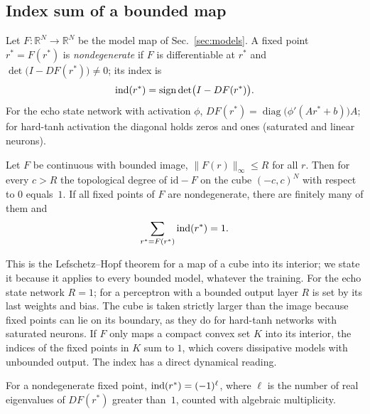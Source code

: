 \subsection{Index sum of a bounded map}
\label{sec:degree}

Let $F:\mathbb{R}^N\to\mathbb{R}^N$ be the model map of Sec.~\ref{sec:models}. A fixed point $r^*=F(r^*)$ is
\emph{nondegenerate} if $F$ is differentiable at $r^*$ and $\det\bigl(I-DF(r^*)\bigr)\neq0$; its index is
\begin{equation}
\operatorname{ind}(r^*)=\operatorname{sign}\det\bigl(I-DF(r^*)\bigr).
\label{eq:index}
\end{equation}
For the echo state network with activation $\phi$, $DF(r^*)=\operatorname{diag}\bigl(\phi'(Ar^*+b)\bigr)A$; for hard-tanh activation the diagonal
holds zeros and ones (saturated and linear neurons).

\begin{theorem}
\label{thm:degree}
Let $F$ be continuous with bounded image, $\|F(r)\|_\infty\le R$ for all $r$. Then for every $c>R$ the topological
degree of $\mathrm{id}-F$ on the cube $(-c,c)^N$ with respect to $0$ equals~$1$. If all fixed points of $F$ are
nondegenerate, there are finitely many of them and
\begin{equation}
\sum_{r^*=F(r^*)}\operatorname{ind}(r^*)=1.
\label{eq:indexsum}
\end{equation}
\end{theorem}

This is the Lefschetz--Hopf theorem for a map of a cube into its interior;\cite{GranasDugundji2003Fixed,Deimling1985NFA}
we state it because it applies to every bounded model, whatever the training. For the echo state network $R=1$; for a
perceptron with a bounded output layer $R$ is set by its last weights and bias. The cube is taken strictly larger than the
image because fixed points can lie on its boundary, as they do for hard-tanh networks with saturated neurons. If $F$ only
maps a compact convex set $K$ into its interior, the indices of the fixed points in $K$ sum to $1$, which covers
dissipative models with unbounded output. The index has a direct dynamical reading.\cite{KatokHasselblatt1995Intro}

\begin{lemma}
\label{lem:parity}
For a nondegenerate fixed point, $\operatorname{ind}(r^*)=(-1)^\ell$, where $\ell$ is the number of real eigenvalues of $DF(r^*)$ greater
than~$1$, counted with algebraic multiplicity.
\end{lemma}

